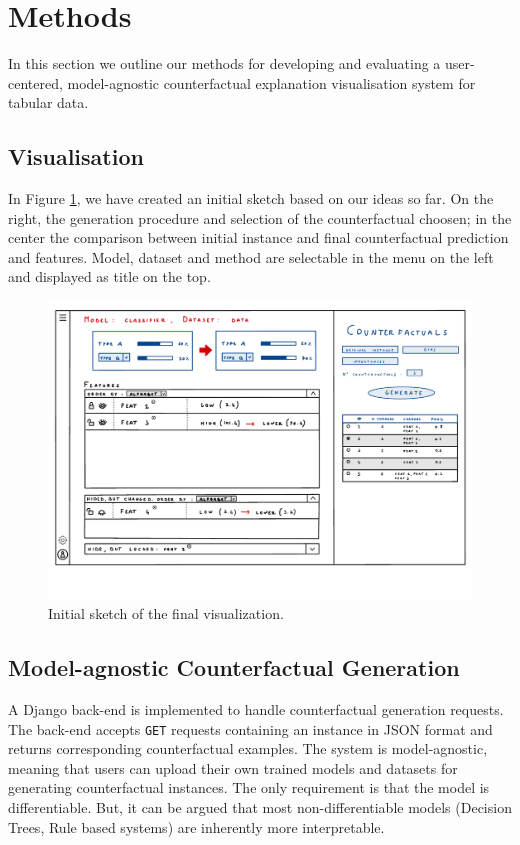 \section*{Methods}

In this section we outline our methods for developing and evaluating a user-centered, model-agnostic counterfactual explanation visualisation system for tabular data.

\subsection*{Visualisation}
In Figure \ref{fig:main_page}, we have created an initial sketch based on our ideas so far. On the right, the generation procedure and selection of the counterfactual choosen; in the center the comparison between initial instance and final counterfactual prediction and features. Model, dataset and method are selectable in the menu on the left and displayed as title on the top.
\begin{figure}[h]\centering
	\includegraphics[width=\linewidth]{fig/counterfactual_main.pdf}
	\caption{Initial sketch of the final visualization.}
	\label{fig:main_page}
\end{figure}

\subsection*{Model-agnostic Counterfactual Generation}
A Django back-end is implemented to handle counterfactual generation requests. The back-end accepts \texttt{GET} requests containing an instance in JSON format and returns corresponding counterfactual examples. The system is model-agnostic, meaning that users can  upload their own trained models and datasets for generating counterfactual instances. The only requirement is that the model is differentiable. But, it can be argued that most non-differentiable models (Decision Trees, Rule based systems) are inherently more interpretable.

